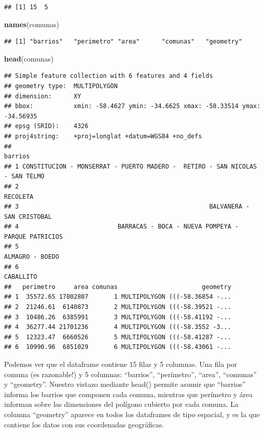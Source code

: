 \documentclass[spanish,]{book}
\newenvironment{Shaded}{\begin{snugshade}}{\end{snugshade}}
\newcommand{\KeywordTok}[1]{\textcolor[rgb]{0.13,0.29,0.53}{\textbf{#1}}}
\newcommand{\NormalTok}[1]{#1}
\begin{document}
\begin{verbatim}
## [1] 15  5
\end{verbatim}

\begin{Shaded}
\begin{Highlighting}[]
\KeywordTok{names}\NormalTok{(comunas)}
\end{Highlighting}
\end{Shaded}

\begin{verbatim}
## [1] "barrios"   "perimetro" "area"      "comunas"   "geometry"
\end{verbatim}

\begin{Shaded}
\begin{Highlighting}[]
\KeywordTok{head}\NormalTok{(comunas)}
\end{Highlighting}
\end{Shaded}

\begin{verbatim}
## Simple feature collection with 6 features and 4 fields
## geometry type:  MULTIPOLYGON
## dimension:      XY
## bbox:           xmin: -58.4627 ymin: -34.6625 xmax: -58.33514 ymax: -34.56935
## epsg (SRID):    4326
## proj4string:    +proj=longlat +datum=WGS84 +no_defs
##                                                                        barrios
## 1 CONSTITUCION - MONSERRAT - PUERTO MADERO -  RETIRO - SAN NICOLAS - SAN TELMO
## 2                                                                     RECOLETA
## 3                                                    BALVANERA - SAN CRISTOBAL
## 4                           BARRACAS - BOCA - NUEVA POMPEYA - PARQUE PATRICIOS
## 5                                                              ALMAGRO - BOEDO
## 6                                                                    CABALLITO
##   perimetro     area comunas                       geometry
## 1  35572.65 17802807       1 MULTIPOLYGON (((-58.36854 -...
## 2  21246.61  6140873       2 MULTIPOLYGON (((-58.39521 -...
## 3  10486.26  6385991       3 MULTIPOLYGON (((-58.41192 -...
## 4  36277.44 21701236       4 MULTIPOLYGON (((-58.3552 -3...
## 5  12323.47  6660526       5 MULTIPOLYGON (((-58.41287 -...
## 6  10990.96  6851029       6 MULTIPOLYGON (((-58.43061 -...
\end{verbatim}

Podemos ver que el dataframe contiene 15 filas y 5 columnas. Una fila por comuna (es razonable!) y 5 columnas: ``barrios'', ``perímetro'', ``area'', ``comunas'' y ``geometry''. Nuestro vistazo mediante head() permite asumir que ``barrios'' informa los barrios que componen cada comuna, mientras que perímetro y área informan sobre las dimensiones del polígono cubierto por cada comuna. La columna ``geometry'' aparece en todos los dataframes de tipo espacial, y es la que contiene los datos con sus coordenadas geográficas.
\end{document}
